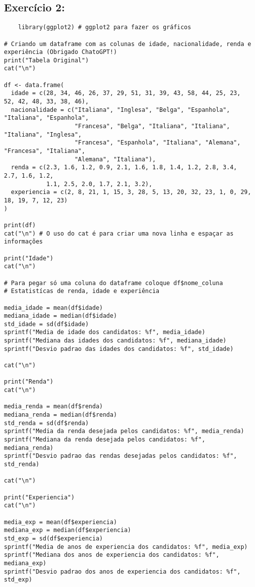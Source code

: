 \documentclass[a4paper,11pt]{article}
\begin{document}
\subsection{Exercício 2:}

\begin{lstlisting}
    library(ggplot2) # ggplot2 para fazer os gráficos

# Criando um dataframe com as colunas de idade, nacionalidade, renda e experiência (Obrigado ChatoGPT!)
print("Tabela Original")
cat("\n")

df <- data.frame(
  idade = c(28, 34, 46, 26, 37, 29, 51, 31, 39, 43, 58, 44, 25, 23, 52, 42, 48, 33, 38, 46),
  nacionalidade = c("Italiana", "Inglesa", "Belga", "Espanhola", "Italiana", "Espanhola", 
                    "Francesa", "Belga", "Italiana", "Italiana", "Italiana", "Inglesa", 
                    "Francesa", "Espanhola", "Italiana", "Alemana", "Francesa", "Italiana", 
                    "Alemana", "Italiana"),
  renda = c(2.3, 1.6, 1.2, 0.9, 2.1, 1.6, 1.8, 1.4, 1.2, 2.8, 3.4, 2.7, 1.6, 1.2, 
            1.1, 2.5, 2.0, 1.7, 2.1, 3.2),
  experiencia = c(2, 8, 21, 1, 15, 3, 28, 5, 13, 20, 32, 23, 1, 0, 29, 18, 19, 7, 12, 23)
)

print(df)
cat("\n") # O uso do cat é para criar uma nova linha e espaçar as informações

print("Idade")
cat("\n")

# Para pegar só uma coluna do dataframe coloque df$nome_coluna
# Estatistícas de renda, idade e experiência

media_idade = mean(df$idade) 
mediana_idade = median(df$idade)
std_idade = sd(df$idade)
sprintf("Media de idade dos candidatos: %f", media_idade)
sprintf("Mediana das idades dos candidatos: %f", mediana_idade)
sprintf("Desvio padrao das idades dos candidatos: %f", std_idade)

cat("\n")

print("Renda")
cat("\n")

media_renda = mean(df$renda)
mediana_renda = median(df$renda)
std_renda = sd(df$renda)
sprintf("Media da renda desejada pelos candidatos: %f", media_renda)
sprintf("Mediana da renda desejada pelos candidatos: %f", mediana_renda)
sprintf("Desvio padrao das rendas desejadas pelos candidatos: %f", std_renda)

cat("\n")

print("Experiencia")
cat("\n")

media_exp = mean(df$experiencia)
mediana_exp = median(df$experiencia)
std_exp = sd(df$experiencia)
sprintf("Media de anos de experiencia dos candidatos: %f", media_exp)
sprintf("Mediana dos anos de experiencia dos candidatos: %f", mediana_exp)
sprintf("Desvio padrao dos anos de experiencia dos candidatos: %f", std_exp)


\end{lstlisting}
\end{document}
